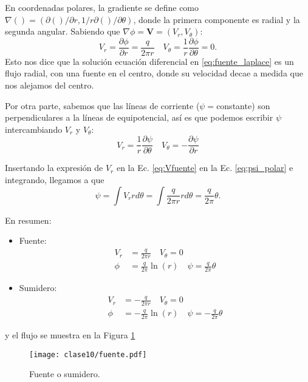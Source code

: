 En coordenadas polares, la gradiente se define como $\nabla()=(\partial()/\partial r,1/r\partial()/\partial\theta)$, donde la primera componente es radial y la segunda angular.
Sabiendo que $\nabla\phi=\mathbf{V}=(V_r,V_\theta)$:
%
\begin{equation}\label{eq:Vfuente}
V_r = \frac{\partial\phi}{\partial r} = \frac{q}{2\pi r}\quad V_\theta= \frac{1}{r}\frac{\partial\phi}{\partial\theta}=0.
\end{equation}
%
Esto nos dice que la solución ecuación diferencial en \eqref{eq:fuente_laplace} es un flujo radial, con una fuente en el centro, donde su velocidad decae a medida que nos alejamos del centro.

Por otra parte, sabemos que las líneas de corriente ($\psi=$constante) son perpendiculares a la líneas de equipotencial, así es que podemos escribir $\psi$ intercambiando $V_r$ y $V_\theta$:
\begin{equation}\label{eq:psi_polar}
V_r=\frac{1}{r}\frac{\partial\psi}{\partial\theta} \quad V_\theta=-\frac{\partial\psi}{\partial r}
\end{equation}

Insertando la expresión de $V_r$ en la Ec. \eqref{eq:Vfuente} en la Ec. \eqref{eq:psi_polar} e integrando, llegamos a que
%
\begin{equation}
\psi = \int V_rr d\theta = \int\frac{q}{2\pi r} rd\theta = \frac{q}{2\pi}\theta. 
\end{equation}

En resumen:
\begin{itemize}
\item Fuente:
\begin{align}
V_r &= \frac{q}{2\pi r}\quad V_\theta=0\nonumber\\
\phi&=\frac{q}{2\pi}\ln(r) \quad \psi=\frac{q}{2\pi}\theta
\end{align}
\item Sumidero:
\begin{align}
V_r &= -\frac{q}{2\pi r}\quad V_\theta=0\nonumber\\
\phi&=-\frac{q}{2\pi}\ln(r) \quad \psi=-\frac{q}{2\pi}\theta
\end{align}
\end{itemize}
%
y el flujo se muestra en la Figura \ref{fig:fuente}
%
\begin{figure}[h!]
\centering
\texttt{[image: clase10/fuente.pdf]}
\caption{Fuente o sumidero.}
\label{fig:fuente}
\end{figure}


